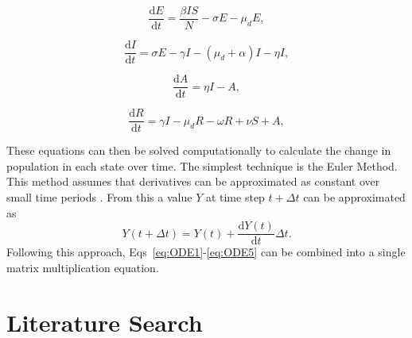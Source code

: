 \documentclass{article}
\newcommand{\diff}{\mathrm{d}}
\begin{document}
\begin{equation}
    \frac{\diff E}{\diff t} = \frac{\beta I S}{N} - \sigma E - \mu_d E,
    \label{eq:ODE2}
\end{equation}

\begin{equation}
    \frac{\diff I}{\diff t} = \sigma E - \gamma I - (\mu_d + \alpha) I - \eta I,
    \label{eq:ODE3}
\end{equation}

\begin{equation}
    \frac{\diff A}{\diff t} = \eta I - A,
    \label{eq:ODE4}
\end{equation}

\begin{equation}
    \frac{\diff R}{\diff t} = \gamma I - \mu_d R - \omega R + \nu S + A,
    \label{eq:ODE5}
\end{equation}

These equations can then be solved computationally to calculate the change in population in each state over time. The simplest technique is the Euler Method. This method assumes that derivatives can be approximated as constant over small time periods \cite{Butcher2008}. From this a value $Y$ at time step $t + \Delta t$ can be approximated as
\begin{equation}
    Y(t+\Delta t) = Y(t) + \frac{\diff Y(t)}{\diff t}\Delta t.
\end{equation}
%
Following this approach, Eqs~\ref{eq:ODE1}-\ref{eq:ODE5} can be combined into a single matrix multiplication equation.

\section{Literature Search}
\end{document}

